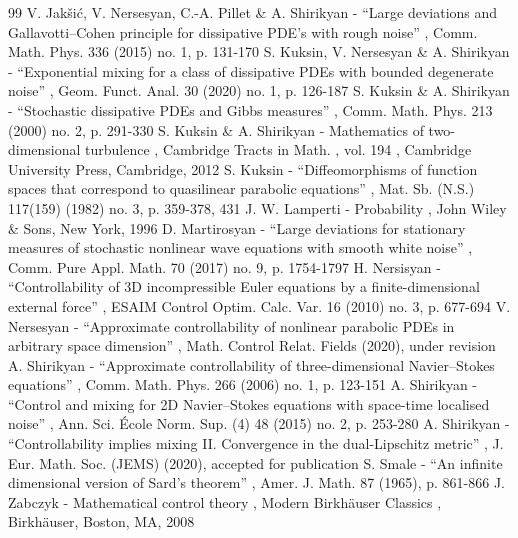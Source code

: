 \begin{thebibliography}{99}
 V. Jakšić, V. Nersesyan, C.-A. Pillet \& A. Shirikyan - “Large deviations and Gallavotti–Cohen principle for dissipative PDE’s with rough noise” , Comm. Math. Phys. 336 (2015) no. 1, p. 131-170
 S. Kuksin, V. Nersesyan \& A. Shirikyan - “Exponential mixing for a class of dissipative PDEs with bounded degenerate noise” , Geom. Funct. Anal. 30 (2020) no. 1, p. 126-187
 S. Kuksin \& A. Shirikyan - “Stochastic dissipative PDEs and Gibbs measures” , Comm. Math. Phys. 213 (2000) no. 2, p. 291-330
 S. Kuksin \& A. Shirikyan - Mathematics of two-dimensional turbulence , Cambridge Tracts in Math. , vol. 194 , Cambridge University Press, Cambridge, 2012
 S. Kuksin - “Diffeomorphisms of function spaces that correspond to quasilinear parabolic equations” , Mat. Sb. (N.S.) 117(159) (1982) no. 3, p. 359-378, 431
 J. W. Lamperti - Probability , John Wiley \& Sons, New York, 1996
 D. Martirosyan - “Large deviations for stationary measures of stochastic nonlinear wave equations with smooth white noise” , Comm. Pure Appl. Math. 70 (2017) no. 9, p. 1754-1797
 H. Nersisyan - “Controllability of 3D incompressible Euler equations by a finite-dimensional external force” , ESAIM Control Optim. Calc. Var. 16 (2010) no. 3, p. 677-694
 V. Nersesyan - “Approximate controllability of nonlinear parabolic PDEs in arbitrary space dimension” , Math. Control Relat. Fields (2020), under revision
 A. Shirikyan - “Approximate controllability of three-dimensional Navier–Stokes equations” , Comm. Math. Phys. 266 (2006) no. 1, p. 123-151
 A. Shirikyan - “Control and mixing for 2D Navier–Stokes equations with space-time localised noise” , Ann. Sci. École Norm. Sup. (4) 48 (2015) no. 2, p. 253-280
 A. Shirikyan - “Controllability implies mixing II. Convergence in the dual-Lipschitz metric” , J. Eur. Math. Soc. (JEMS) (2020), accepted for publication
 S. Smale - “An infinite dimensional version of Sard’s theorem” , Amer. J. Math. 87 (1965), p. 861-866
 J. Zabczyk - Mathematical control theory , Modern Birkhäuser Classics , Birkhäuser, Boston, MA, 2008
\end{thebibliography}
